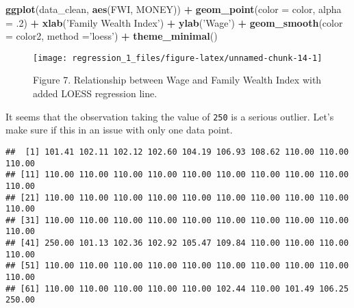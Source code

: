 \documentclass[]{article}
\newenvironment{Shaded}{\begin{snugshade}}{\end{snugshade}}
\newcommand{\DataTypeTok}[1]{\textcolor[rgb]{0.13,0.29,0.53}{#1}}
\newcommand{\DecValTok}[1]{\textcolor[rgb]{0.00,0.00,0.81}{#1}}
\newcommand{\FloatTok}[1]{\textcolor[rgb]{0.00,0.00,0.81}{#1}}
\newcommand{\KeywordTok}[1]{\textcolor[rgb]{0.13,0.29,0.53}{\textbf{#1}}}
\newcommand{\NormalTok}[1]{#1}
\newcommand{\OperatorTok}[1]{\textcolor[rgb]{0.81,0.36,0.00}{\textbf{#1}}}
\newcommand{\StringTok}[1]{\textcolor[rgb]{0.31,0.60,0.02}{#1}}
\begin{document}
\begin{Shaded}
\begin{Highlighting}[]
\KeywordTok{ggplot}\NormalTok{(data_clean, }\KeywordTok{aes}\NormalTok{(FWI, MONEY)) }\OperatorTok{+}\StringTok{ }\KeywordTok{geom_point}\NormalTok{(}\DataTypeTok{color =}\NormalTok{ color, }
                                          \DataTypeTok{alpha =} \FloatTok{.2}\NormalTok{) }\OperatorTok{+}\StringTok{ }
\StringTok{                               }\KeywordTok{xlab}\NormalTok{(}\StringTok{'Family Wealth Index'}\NormalTok{) }\OperatorTok{+}\StringTok{ }
\StringTok{                               }\KeywordTok{ylab}\NormalTok{(}\StringTok{'Wage'}\NormalTok{) }\OperatorTok{+}\StringTok{ }
\StringTok{                               }\KeywordTok{geom_smooth}\NormalTok{(}\DataTypeTok{color  =}\NormalTok{ color2, }
                                           \DataTypeTok{method =}\StringTok{'loess'}\NormalTok{) }\OperatorTok{+}\StringTok{ }
\StringTok{                               }\KeywordTok{theme_minimal}\NormalTok{()}
\end{Highlighting}
\end{Shaded}

\begin{figure}

{\centering \texttt{[image: regression\_1\_files/figure-latex/unnamed-chunk-14-1]} 

}

\caption{Figure 7. Relationship between Wage and Family Wealth Index with added LOESS regression line.}\label{fig:unnamed-chunk-14}
\end{figure}

It seems that the observation taking the value of \texttt{250} is a
serious outlier. Let's make sure if this in an issue with only one data
point.

\begin{Shaded}
\end{Shaded}

\begin{verbatim}
##  [1] 101.41 102.11 102.12 102.60 104.19 106.93 108.62 110.00 110.00 110.00
## [11] 110.00 110.00 110.00 110.00 110.00 110.00 110.00 110.00 110.00 110.00
## [21] 110.00 110.00 110.00 110.00 110.00 110.00 110.00 110.00 110.00 110.00
## [31] 110.00 110.00 110.00 110.00 110.00 110.00 110.00 110.00 110.00 110.00
## [41] 250.00 101.13 102.36 102.92 105.47 109.84 110.00 110.00 110.00 110.00
## [51] 110.00 110.00 110.00 110.00 110.00 110.00 110.00 110.00 110.00 110.00
## [61] 110.00 110.00 110.00 110.00 110.00 102.44 110.00 101.49 106.25 250.00
\end{verbatim}
\end{document}
